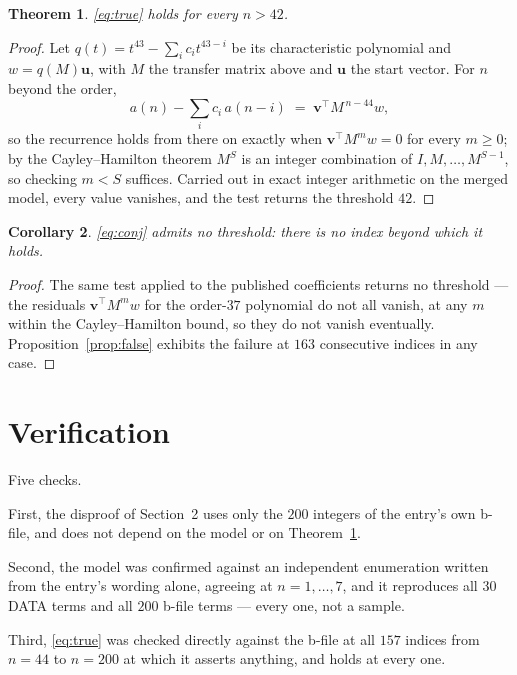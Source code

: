 \documentclass[11pt,a4paper]{article}
\theoremstyle{plain}
\newtheorem{theorem}{Theorem}
\newtheorem{corollary}[theorem]{Corollary}
\theoremstyle{definition}
\begin{document}
\begin{theorem}\label{thm:true}
\eqref{eq:true} holds for every $n>42$.
\end{theorem}

\begin{proof}
Let $q(t)=t^{43}-\sum_i c_it^{43-i}$ be its characteristic polynomial and $w=q(M)\mathbf u$,
with $M$ the transfer matrix above and $\mathbf u$ the start vector. For $n$ beyond the order,
\[
a(n)-\sum_i c_i\,a(n-i)\;=\;\mathbf v^{\!\top}M^{\,n-44}w ,
\]
so the recurrence holds from there on exactly when $\mathbf v^{\!\top}M^{m}w=0$ for every
$m\ge0$; by the Cayley--Hamilton theorem $M^{S}$ is an integer combination of
$I,M,\dots,M^{S-1}$, so checking $m<S$ suffices. Carried out in exact integer arithmetic on
the merged model, every value vanishes, and the test returns the threshold $42$.
\end{proof}

\begin{corollary}
\eqref{eq:conj} admits no threshold: there is no index beyond which it holds.
\end{corollary}

\begin{proof}
The same test applied to the published coefficients returns no threshold --- the residuals
$\mathbf v^{\!\top}M^{m}w$ for the order-$37$ polynomial do not all vanish, at any $m$ within
the Cayley--Hamilton bound, so they do not vanish eventually. Proposition~\ref{prop:false}
exhibits the failure at $163$ consecutive indices in any case.
\end{proof}

\section{Verification}

Five checks.

First, the disproof of Section~2 uses only the $200$ integers of the entry's own b-file, and
does not depend on the model or on Theorem~\ref{thm:true}.

Second, the model was confirmed against an independent enumeration written from the entry's
wording alone, agreeing at $n=1,\dots,7$, and it reproduces all $30$ DATA terms and all $200$
b-file terms --- every one, not a sample.

Third, \eqref{eq:true} was checked directly against the b-file at all $157$ indices from
$n=44$ to $n=200$ at which it asserts anything, and holds at every one.
\end{document}
